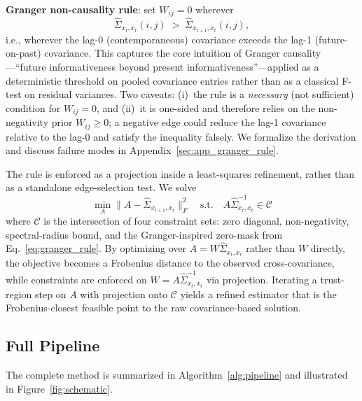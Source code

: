 \documentclass{article}
\begin{document}
\textbf{Granger non-causality rule}: set $W_{ij} = 0$ wherever
\begin{equation}
    \hat{\Sigma}_{x_t, x_t}(i,j) \;>\; \hat{\Sigma}_{x_{t+1}, x_t}(i,j),
    \label{eq:granger_rule}
\end{equation}
i.e., wherever the lag-0 (contemporaneous) covariance exceeds the lag-1 (future-on-past) covariance.
This captures the core intuition of Granger causality---``future informativeness beyond present informativeness''---applied as a deterministic threshold on pooled covariance entries rather than as a classical F-test on residual variances.
Two caveats: (i)~the rule is a \emph{necessary} (not sufficient) condition for $W_{ij} = 0$, and (ii)~it is one-sided and therefore relies on the non-negativity prior $W_{ij} \geq 0$; a negative edge could reduce the lag-1 covariance relative to the lag-0 and satisfy the inequality falsely.
We formalize the derivation and discuss failure modes in Appendix~\ref{sec:app_granger_rule}.

The rule is enforced as a projection inside a least-squares refinement, rather than as a standalone edge-selection test.
We solve
\begin{equation}
    \min_A \|A - \hat{\Sigma}_{x_{t+1}, x_t}\|_F^2 \quad \text{s.t.} \quad A \hat{\Sigma}_{x_t, x_t}^{-1} \in \mathcal{C}
    \label{eq:optimization}
\end{equation}
where $\mathcal{C}$ is the intersection of four constraint sets: zero diagonal, non-negativity, spectral-radius bound, and the Granger-inspired zero-mask from Eq.~\eqref{eq:granger_rule}.
By optimizing over $A = W\hat{\Sigma}_{x_t,x_t}$ rather than $W$ directly, the objective becomes a Frobenius distance to the observed cross-covariance, while constraints are enforced on $W = A\hat{\Sigma}_{x_t,x_t}^{-1}$ via projection.
Iterating a trust-region step on $A$ with projection onto $\mathcal{C}$ yields a refined estimator that is the Frobenius-closest feasible point to the raw covariance-based solution.

\subsection{Full Pipeline}

The complete method is summarized in Algorithm~\ref{alg:pipeline} and illustrated in Figure~\ref{fig:schematic}.
\end{document}
